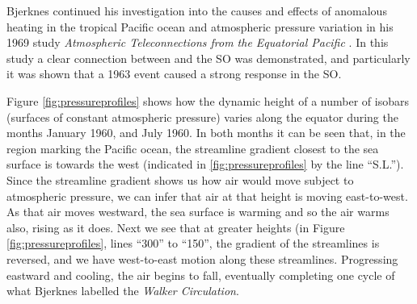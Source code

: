 Bjerknes continued his investigation into the causes and effects of anomalous
heating in the tropical Pacific ocean and atmospheric pressure variation in his
1969 study \emph{Atmospheric Teleconnections from the Equatorial Pacific}
\citep{bjerknes1969}. In this study a clear connection between \elnino{} and the
SO was demonstrated, and particularly it was shown that a 1963 \elnino{} event
caused a strong response in the SO.

Figure \ref{fig:pressureprofiles} shows how the dynamic height of a number of
isobars (surfaces of constant atmospheric pressure) varies along the equator
during the months January 1960, and July 1960. In both months it can be seen
that, in the region marking the Pacific ocean, the streamline gradient closest
to the sea surface is towards the west (indicated in \ref{fig:pressureprofiles}
by the line ``S.L.''). Since the streamline gradient shows us how air would move
subject to atmospheric pressure, we can infer that air at that height is moving
east-to-west. As that air moves westward, the sea surface is warming and so the
air warms also, rising as it does. Next we see that at greater heights (in
Figure \ref{fig:pressureprofiles}, lines ``300'' to ``150'', the gradient of the
streamlines is reversed, and we have west-to-east motion along these
streamlines. Progressing eastward and cooling, the air begins to fall,
eventually completing one cycle of what Bjerknes labelled the \emph{Walker
  Circulation}.

